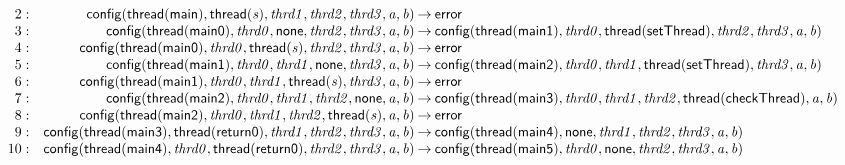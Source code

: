 \documentclass[a4paper]{article}
\newcommand{\symb}[1]{\mathsf{#1}}
\newcommand{\var}[1]{\mathit{#1}}
\begin{document}
\begin{landscape}
\[\begin{array}{rr@{\>}c@{\>}ll}
\mathrm{2} : 
 & \symb{config}(\symb{thread}(\symb{main}),\symb{thread}(\var{s}),\var{thrd1},\var{thrd2},\var{thrd3},\var{a},\var{b})
 & \to 
 & \symb{error}\\

\mathrm{3} : 
 & \symb{config}(\symb{thread}(\symb{main0}),\var{thrd0},\symb{none},\var{thrd2},\var{thrd3},\var{a},\var{b})
 & \to 
 & \symb{config}(\symb{thread}(\symb{main1}),\var{thrd0},\symb{thread}(\symb{setThread}),\var{thrd2},\var{thrd3},\var{a},\var{b})\\

\mathrm{4} : 
 & \symb{config}(\symb{thread}(\symb{main0}),\var{thrd0},\symb{thread}(\var{s}),\var{thrd2},\var{thrd3},\var{a},\var{b})
 & \to 
 & \symb{error}\\

\mathrm{5} : 
 & \symb{config}(\symb{thread}(\symb{main1}),\var{thrd0},\var{thrd1},\symb{none},\var{thrd3},\var{a},\var{b})
 & \to 
 & \symb{config}(\symb{thread}(\symb{main2}),\var{thrd0},\var{thrd1},\symb{thread}(\symb{setThread}),\var{thrd3},\var{a},\var{b})\\

\mathrm{6} : 
 & \symb{config}(\symb{thread}(\symb{main1}),\var{thrd0},\var{thrd1},\symb{thread}(\var{s}),\var{thrd3},\var{a},\var{b})
 & \to 
 & \symb{error}\\

\mathrm{7} : 
 & \symb{config}(\symb{thread}(\symb{main2}),\var{thrd0},\var{thrd1},\var{thrd2},\symb{none},\var{a},\var{b})
 & \to 
 & \symb{config}(\symb{thread}(\symb{main3}),\var{thrd0},\var{thrd1},\var{thrd2},\symb{thread}(\symb{checkThread}),\var{a},\var{b})\\

\mathrm{8} : 
 & \symb{config}(\symb{thread}(\symb{main2}),\var{thrd0},\var{thrd1},\var{thrd2},\symb{thread}(\var{s}),\var{a},\var{b})
 & \to 
 & \symb{error}\\

\mathrm{9} : 
 & \symb{config}(\symb{thread}(\symb{main3}),\symb{thread}(\symb{return0}),\var{thrd1},\var{thrd2},\var{thrd3},\var{a},\var{b})
 & \to 
 & \symb{config}(\symb{thread}(\symb{main4}),\symb{none},\var{thrd1},\var{thrd2},\var{thrd3},\var{a},\var{b})\\

\mathrm{10} : 
 & \symb{config}(\symb{thread}(\symb{main4}),\var{thrd0},\symb{thread}(\symb{return0}),\var{thrd2},\var{thrd3},\var{a},\var{b})
 & \to 
 & \symb{config}(\symb{thread}(\symb{main5}),\var{thrd0},\symb{none},\var{thrd2},\var{thrd3},\var{a},\var{b})\\


\end{array}\]
\end{landscape}
\end{document}
